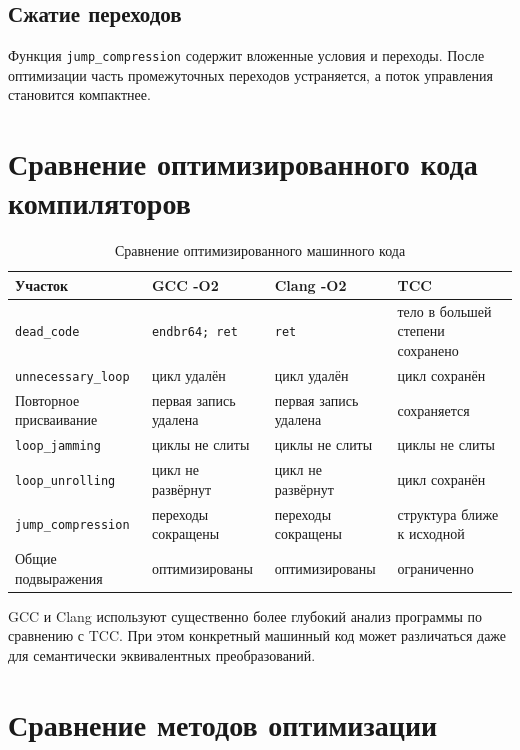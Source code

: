 \documentclass[12pt,a4paper]{article}
\begin{document}
\subsection{Сжатие переходов}

Функция \texttt{jump\_compression} содержит вложенные условия и переходы. После оптимизации часть промежуточных переходов устраняется, а поток управления становится компактнее.

\section{Сравнение оптимизированного кода компиляторов}

\begin{table}[H]
\centering
\caption{Сравнение оптимизированного машинного кода}
\small
\begin{tabular}{p{3cm}p{4cm}p{4cm}p{3cm}}
\toprule
Участок & GCC -O2 & Clang -O2 & TCC \\
\midrule
\texttt{dead\_code} & \texttt{endbr64; ret} &
\texttt{ret} & тело в большей степени сохранено \\
\texttt{unnecessary\_loop} & цикл удалён &
цикл удалён & цикл сохранён \\
Повторное присваивание & первая запись удалена &
первая запись удалена & сохраняется \\
\texttt{loop\_jamming} & циклы не слиты &
циклы не слиты & циклы не слиты \\
\texttt{loop\_unrolling} & цикл не развёрнут &
цикл не развёрнут & цикл сохранён \\
\texttt{jump\_compression} & переходы сокращены &
переходы сокращены & структура ближе к исходной \\
Общие подвыражения & оптимизированы &
оптимизированы & ограниченно \\
\bottomrule
\end{tabular}
\end{table}

GCC и Clang используют существенно более глубокий анализ программы по сравнению с TCC. При этом конкретный машинный код может различаться даже для семантически эквивалентных преобразований.

\section{Сравнение методов оптимизации}
\end{document}
